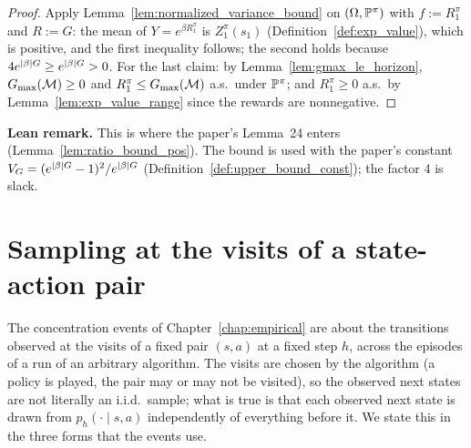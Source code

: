 \begin{proof}
\leanok
Apply Lemma~\ref{lem:normalized_variance_bound} on $(\Omega, \mathbb{P}^\pi)$ with $f := R^\pi_1$ and
$R := G$: the mean of $Y = e^{\beta R^\pi_1}$ is $Z^\pi_1(s_1)$ (Definition~\ref{def:exp_value}),
which is positive, and the first inequality follows; the second holds because
$4e^{\lvert \beta \rvert G} \ge e^{\lvert \beta \rvert G} > 0$. For the last claim: by
Lemma~\ref{lem:gmax_le_horizon}, $G_{\max}(\mathcal M) \ge 0$ and $R^\pi_1 \le G_{\max}(\mathcal M)$
a.s.\ under $\mathbb{P}^\pi$; and $R^\pi_1 \ge 0$ a.s.\ by Lemma~\ref{lem:exp_value_range} since the
rewards are nonnegative.
\end{proof}

\textbf{Lean remark.} This is where the paper's Lemma~24 enters (Lemma~\ref{lem:ratio_bound_pos}).
The bound is used with the paper's constant $V_G = (e^{\lvert \beta \rvert G} - 1)^2/e^{\lvert \beta \rvert G}$
(Definition~\ref{def:upper_bound_const}); the factor $4$ is slack.

\section{Sampling at the visits of a state-action pair}
\label{sec:pre_mdp_visits}

The concentration events of Chapter~\ref{chap:empirical} are about the transitions observed
at the visits of a fixed pair $(s, a)$ at a fixed step $h$, across the episodes of a run of an
arbitrary algorithm. The visits are chosen by the algorithm (a policy is played, the pair may
or may not be visited), so the observed next states are not literally an i.i.d.\ sample;
what is true is that each observed next state is drawn from $p_h(\cdot \mid s, a)$
independently of everything before it. We state this in the three forms that the events use.

